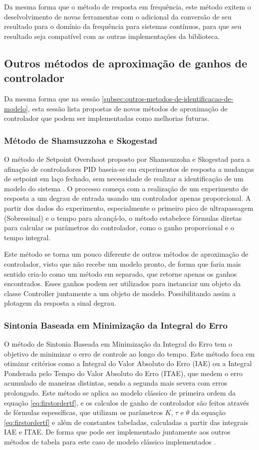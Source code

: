 Da mesma forma que o método de resposta em frequência, este método exitem o deselvolvimento de novas ferramentas
com o adicional da conversão de seu resultado para o domínio da frequência para sistemas contínuos, para que seu
resultado seja compatível com as outras implementações da biblioteca.


\subsection{Outros métodos de aproximação de ganhos de controlador}
Da mesma forma que na sessão \ref{subsec:outros-metodos-de-identificacao-de-modelo}, esta sessão lista propostas
de novos métodos de aproximação de controlador que podem ser implementadas como melhorias futuras.

\subsubsection{Método de Shamsuzzoha e Skogestad}
O método de Setpoint Overshoot proposto por Shamsuzzoha e Skogestad para a afinação de controladores PID baseia-se em
experimentos de resposta a mudanças de setpoint em laço fechado, sem necessidade de realizar a identificação de um
modelo do sistema \cite{skoge}.
O processo começa com a realização de um experimento de resposta a um degrau de entrada usando um controlador apenas
proporcional.
A partir dos dados do experimento, especialmente o primeiro pico de ultrapassagem (Sobressinal) e o tempo para alcançá-lo,
o método estabelece fórmulas diretas para calcular os parâmetros do controlador, como o ganho proporcional e o tempo
integral.

Este método se torna um pouco diferente de outros métodos de aproximação de controlador, visto que não recebe um modelo
pronto, de forma que faria mais sentido cria-lo como um método em separado, que retorne apenas os ganhos encontrados.
Esses ganhos podem ser utilizados para instanciar um objeto da classe Controller juntamente a um objeto de modelo.
Possibilitando assim a plotagem da resposta a sinal degrau.

\subsubsection{Sintonia Baseada em Minimização da Integral do Erro}
O método de Sintonia Baseada em Minimização da Integral do Erro tem o objetivo de minimizar o erro de controle ao
longo do tempo.
Este método foca em otimizar critérios como a Integral do Valor Absoluto do Erro (IAE) ou a Integral Ponderada pelo
Tempo do Valor Absoluto do Erro (ITAE), que medem o erro acumulado de maneiras distintas, sendo a segunda mais severa
com erros prolongado.
Este método se aplica ao modelo clássico de primeira ordem da equação \eqref{eq:firstordertf}, e os calculos de ganho
de controlador são feitos através de fórmulas espessíficas, que utilizam os parâmetros $K$, $\tau$ e $\theta$ da equação
\eqref{eq:firstordertf} e além de constantes tabeladas, calculadas a partir das integrais IAE e ITAE.
De forma que pode ser implementado juntamente aos outros métodos de tabela para este caso de modelo clássico
implementados \cite{apostpidsint}.

